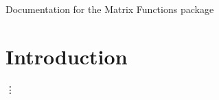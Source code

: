 \documentclass{article}
\begin{document}
\centerline{\sc \large Documentation for the Matrix Functions package}
\vspace{.5pc}
\vspace{2pc}

\tableofcontents

\section{Introduction}
\vdots


\end{document}
